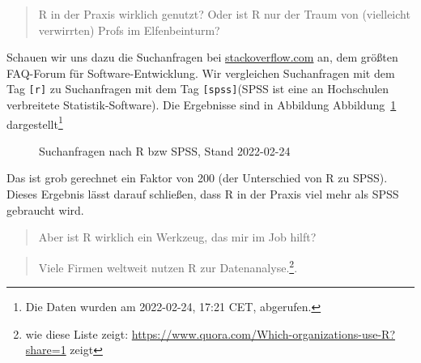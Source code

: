 \documentclass[
  a4paper,
]{scrbook}
\theoremstyle{definition}
\theoremstyle{definition}
\theoremstyle{definition}
\theoremstyle{remark}
\begin{document}
\begin{quote}
{} R in der Praxis wirklich genutzt? Oder ist R nur der
Traum von (vielleicht verwirrten) Profs im Elfenbeinturm?
\end{quote}

Schauen wir uns dazu die Suchanfragen bei
\href{www.stackoverflow.com}{stackoverflow.com} an, dem größten
FAQ-Forum für Software-Entwicklung. Wir vergleichen Suchanfragen mit dem
Tag \texttt{{[}r{]}} zu Suchanfragen mit dem Tag
\texttt{{[}spss{]}}(SPSS ist eine an Hochschulen verbreitete
Statistik-Software). Die Ergebnisse sind in Abbildung
Abbildung~\ref{fig-stackoverflow1} dargestellt\footnote{Die Daten wurden
  am 2022-02-24, 17:21 CET, abgerufen.}

\begin{figure}


\caption{\label{fig-stackoverflow1}Suchanfragen nach R bzw SPSS, Stand
2022-02-24}

\end{figure}%

Das ist grob gerechnet ein Faktor von 200 (der Unterschied von R zu
SPSS). Dieses Ergebnis lässt darauf schließen, dass R in der Praxis viel
mehr als SPSS gebraucht wird.

\begin{quote}
{} Aber ist R wirklich ein Werkzeug, das mir im Job
hilft?
\end{quote}

\begin{quote}
{} Viele Firmen weltweit nutzen R zur
Datenanalyse.\footnote{wie diese Liste zeigt:
  \url{https://www.quora.com/Which-organizations-use-R?share=1} zeigt}.
\end{quote}
\end{document}
